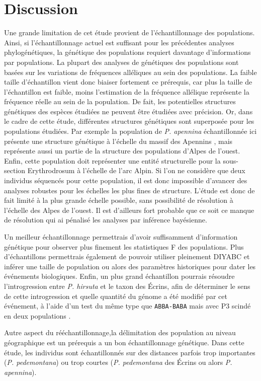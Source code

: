 \section{Discussion}

Une grande limitation de cet étude provient de l'échantillonnage des populations.
 Ainsi, si l'échantillonnage actuel est suffisant pour les précédentes analyses phylogénétiques, la génétique des populations requiert davantage d'informations par populations.
 La plupart des analyses de génétiques des populations sont basées sur les variations de fréquences alléliques au sein des populations.
 La faible taille d'échantillon vient donc biaiser fortement ce prérequis, car plus la taille de l'échantillon est faible, moins l'estimation de la fréquence allélique représente la fréquence réelle au sein de la population.
 De fait, les potentielles structures génétiques des espèces étudiées ne peuvent être étudiées avec précision.
 Or, dans le cadre de cette étude, différentes structures génétiques sont superposée pour les populations étudiées.
 Par exemple la population de \textit{P. apennina} échantillonnée ici présente une structure génétique à l'échelle du massif des Apennins \citep{Crema2009}, mais représente aussi un partie de la structure des populations d'Alpes de l'ouest.
 Enfin, cette population doit représenter une entité structurelle pour la sous-section Erythrodrosum à l'échelle de l'arc Alpin.
 Si l'on ne considère que deux individus séquencés pour cette population, il est donc impossible d'avancer des analyses robustes pour les échelles les plus fines de structure.
 L'étude est donc de fait limité à la plus grande échelle possible, sans possibilité de résolution à l'échelle des Alpes de l'ouest.
 Il est d'ailleurs fort probable que ce soit ce manque de résolution qui ai pénalisé les analyses par inférence bayésienne.


Un meilleur échantillonnage permettrais d'avoir suffisamment d'information génétique pour observer plus finement les statistiques F des populations.
 Plus d'échantillons permettrais également de pouvoir utiliser pleinement DIYABC et inférer une taille de population ou alors des paramètres historiques pour dater les événements biologiques.
 Enfin, un plus grand échantillon pourrais résoudre l'introgression entre \textit{P. hirsuta} et le taxon des Écrins, afin de déterminer le sens de cette introgression et quelle quantité du génome a été modifié par cet événement, à l'aide d'un test du même type que \verb|ABBA-BABA| mais avec P3 scindé en deux populations \citep{Eaton2015}. 

Autre aspect du rééchantillonnage,la délimitation des population au niveau géographique est un prérequis a un bon échantillonnage génétique.
 Dans cette étude, les individus sont échantillonnés sur des distances parfois trop importantes (\textit{P. pedemontana}) ou trop courtes (\textit{P. pedemontana} des Écrins ou alors \textit{P. apennina}).

